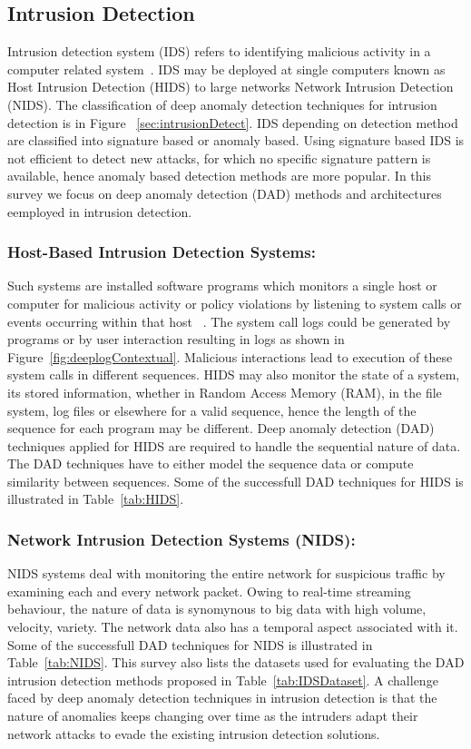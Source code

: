 \subsection{Intrusion Detection}
\label{sec:intrusion_detection}

Intrusion detection  system (IDS) refers to identifying malicious activity in a computer related system~\cite{phoha2002internet}. IDS may be deployed at single computers known as Host Intrusion Detection (HIDS) to large networks Network Intrusion Detection (NIDS). The classification of deep anomaly detection techniques for intrusion detection is in Figure ~\ref{sec:intrusionDetect}. IDS depending on detection method are classified into signature based or anomaly based. Using signature based IDS is not efficient to detect new attacks, for which no specific signature pattern is available, hence anomaly based detection methods are more popular. In this survey we focus on deep anomaly detection (DAD) methods and architectures eemployed in intrusion detection.

\subsubsection{Host-Based Intrusion Detection Systems:}
 Such systems are installed software programs which monitors a single host or computer for malicious  activity or policy violations by listening to system calls or events occurring within that host ~\cite{vigna2005host}. The system call logs could be generated by programs or by user interaction resulting in logs as shown in Figure~\ref{fig:deeplogContextual}. Malicious interactions lead to execution of these system calls in different sequences. HIDS may also monitor the state of a system, its stored information, whether in Random Access Memory (RAM), in the file system, log files or elsewhere for a valid sequence, hence the length of the sequence for each program may be different.
 Deep anomaly detection (DAD) techniques applied for HIDS are required to handle the sequential nature of data. The DAD techniques have to either model the sequence data or compute similarity between sequences. Some of the successfull DAD techniques for HIDS is illustrated in Table~\ref{tab:HIDS}.

\subsubsection{Network Intrusion Detection Systems (NIDS):} NIDS systems deal with monitoring the entire network for suspicious traffic by examining each and every network packet. Owing to real-time streaming behaviour, the nature of data is synomynous to big data with high volume, velocity, variety. The network data also has a temporal aspect associated with it. Some of the successfull DAD techniques for NIDS is illustrated in Table~\ref{tab:NIDS}. This survey also lists the datasets used for evaluating the DAD intrusion detection methods proposed in Table~\ref{tab:IDSDataset}. A challenge faced by deep anomaly detection techniques in intrusion detection is that the nature of anomalies keeps changing over time as the intruders adapt their network attacks to evade the existing intrusion detection solutions.

